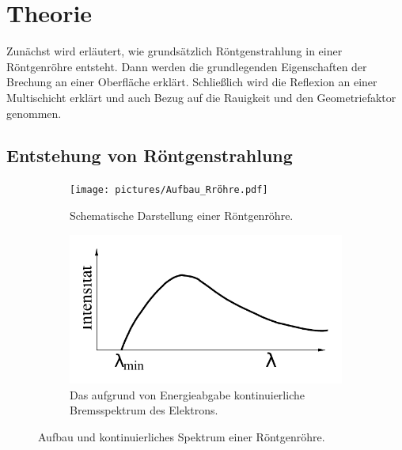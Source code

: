 \section{Theorie}
\label{sec:Theorie}

Zunächst wird erläutert, wie grundsätzlich Röntgenstrahlung in einer Röntgenröhre entsteht.
Dann werden die grundlegenden Eigenschaften der Brechung an einer Oberfläche erklärt.
Schließlich wird die Reflexion an einer Multischicht erklärt und auch Bezug auf die Rauigkeit und den Geometriefaktor genommen.

\subsection{Entstehung von Röntgenstrahlung} \label{sec:Röntgenstrahlung}

\begin{figure}
    \begin{subfigure}{0.48\textwidth}
        \centering
        \texttt{[image: pictures/Aufbau\_Rröhre.pdf]}
        \caption{Schematische Darstellung einer Röntgenröhre. \cite{demtroeder2}}
        \label{fig:aufbau}
    \end{subfigure}
    \begin{subfigure}{0.48\textwidth}
        \centering
        \includegraphics[width=\textwidth]{pictures/bremsspektrum.pdf}
        \caption{Das aufgrund von Energieabgabe kontinuierliche Bremsspektrum des Elektrons. \cite{v602}}
        \label{fig:bremsspektrum}
    \end{subfigure}
    \caption{Aufbau und kontinuierliches Spektrum einer Röntgenröhre.}
\end{figure}

